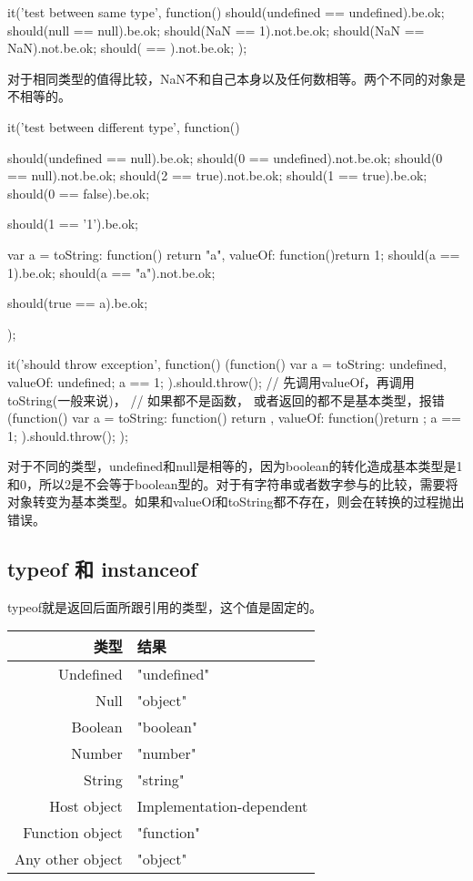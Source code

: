 \begin{JavaScript}
		it('test between same type', function(){
			should(undefined == undefined).be.ok;
			should(null == null).be.ok;
			should(NaN == 1).not.be.ok;
			should(NaN == NaN).not.be.ok;
			should({} == {}).not.be.ok;
		});
\end{JavaScript}
对于相同类型的值得比较，NaN不和自己本身以及任何数相等。两个不同的对象是不相等的。

\begin{JavaScript}
		it('test between different type', function(){
			should(undefined == null).be.ok;
			should(0 == undefined).not.be.ok;
			should(0 == null).not.be.ok;
			should(2 == true).not.be.ok;
			should(1 == true).be.ok;
			should(0 == false).be.ok;

			should(1 == '1').be.ok;

			var a = {
				toString: function() {return "a"},
				valueOf: function(){return 1;}
			}
			should(a == 1).be.ok;
			should(a == "a").not.be.ok;

			should(true == a).be.ok;
		});
\end{JavaScript}
\begin{JavaScript}
		it('should throw exception', function(){
			(function(){
				var a = {toString: undefined, valueOf: undefined};
				a == 1;
			}).should.throw();
			// 先调用valueOf，再调用toString(一般来说)， 
			// 如果都不是函数， 或者返回的都不是基本类型，报错
			(function(){
				var a = {toString: function(){ return {}}, valueOf: function(){return {}}};
				a == 1;
			}).should.throw();
		});
\end{JavaScript}
对于不同的类型，undefined和null是相等的，因为boolean的转化造成基本类型是1和0，所以2是不会等于boolean型的。对于有字符串或者数字参与的比较，需要将对象转变为基本类型。如果和valueOf和toString都不存在，则会在转换的过程抛出错误。

\subsection{typeof 和 instanceof}
typeof就是返回后面所跟引用的类型，这个值是固定的。

\begin{tabular}{|r|l|}
		\hline
		类型	& 	结果\\
		\hline
		Undefined 	& 	"undefined" \\
		\hline
		Null		&	"object" \\
		\hline
		Boolean		&	"boolean" \\
		\hline
		Number		&	"number" \\
		\hline
		String		&	"string" \\
		\hline
		Host object & Implementation-dependent \\
		\hline
		Function object & "function"\\
		\hline
		Any other object &	"object"\\
		\hline
\end{tabular}

